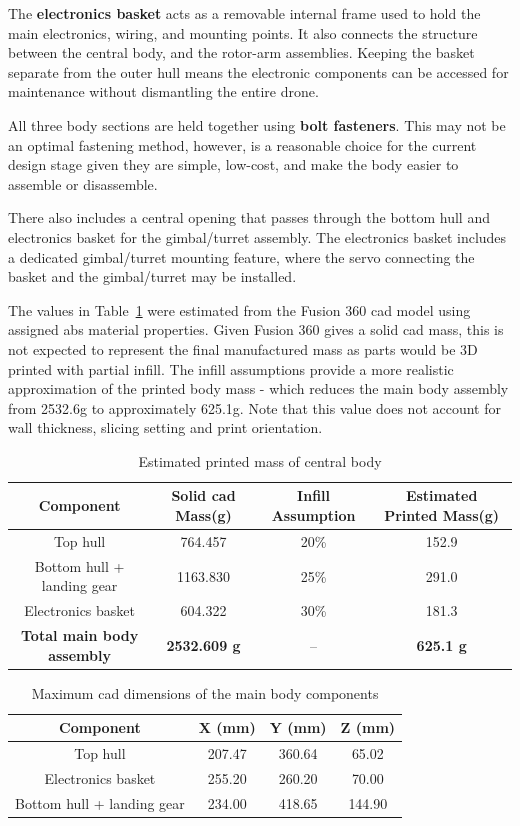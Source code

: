 \documentclass{report_template_oxford}
\begin{document}
The \textbf{electronics basket} acts as a removable internal frame used to hold the main electronics, wiring, and mounting points. It also connects the structure between the central body, and the rotor-arm assemblies. Keeping the basket separate from the outer hull means the electronic components can be accessed for maintenance without dismantling the entire drone.

All three body sections are held together using \textbf{bolt fasteners}. This may not be an optimal fastening method, however, is a reasonable choice for the current design stage given they are simple, low-cost, and make the body easier to assemble or disassemble.

There also includes a central opening that passes through the bottom hull and electronics basket for the gimbal/turret assembly. The electronics basket includes a dedicated gimbal/turret mounting feature, where the servo connecting the basket and the gimbal/turret may be installed.

The values in Table~\ref{tab:main_body_mass_estimate} were estimated from the Fusion 360 \gls{cad} model using assigned \gls{abs} material properties. Given Fusion 360 gives a solid \gls{cad} mass, this is not expected to represent the final manufactured mass as parts would be 3D printed with partial infill. The infill assumptions provide a more realistic approximation of the printed body mass - which reduces the main body assembly from 2532.6g to approximately 625.1g. Note that this value does not account for wall thickness, slicing setting and print orientation.

\begin{table}[htbp]
\centering
\caption{Estimated printed mass of central body}
\label{tab:main_body_mass_estimate}
\begin{tabular}{|c|c|c|c|}
\hline
\textbf{Component} & \textbf{Solid \gls{cad} Mass(g)} & \textbf{Infill Assumption} & \textbf{Estimated Printed Mass(g)} \\
\hline
Top hull & 764.457 & 20\% & 152.9 \\
Bottom hull + landing gear & 1163.830 & 25\% & 291.0 \\
Electronics basket & 604.322 & 30\% & 181.3 \\
\hline
\textbf{Total main body assembly} & \textbf{2532.609 g} & -- & \textbf{625.1 g} \\
\hline
\end{tabular}
\end{table}

\begin{table}[htbp]
\centering
\caption{Maximum \gls{cad} dimensions of the main body components}
\label{tab:main_body_dimensions}
\begin{tabular}{|c|c|c|c|}
\hline
\textbf{Component} & \textbf{X (mm)} & \textbf{Y (mm)} & \textbf{Z (mm)} \\
\hline
Top hull & 207.47 & 360.64 & 65.02 \\
Electronics basket & 255.20 & 260.20 & 70.00 \\
Bottom hull + landing gear & 234.00 & 418.65 & 144.90 \\
\hline
\end{tabular}
\end{table}
\end{document}
